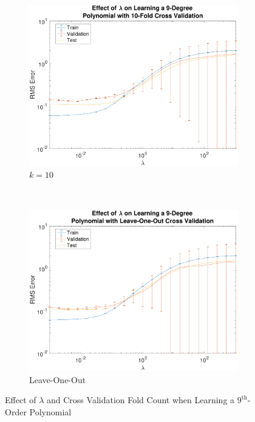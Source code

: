 \documentclass{report}
\begin{document}
  \begin{figure}
    \centering
    \begin{subfigure}[t]{0.45\textwidth}
      \centering
      \includegraphics[width=1.0\textwidth]{lambda_sweep_k=10_degree=9.pdf}
      \caption{$k=10$}\label{fig:tenFoldCv}
    \end{subfigure}%
    ~ 
    \begin{subfigure}[t]{0.45\textwidth}
      \centering
      \includegraphics[width=1.0\textwidth]{lambda_sweep_leave_one_out_degree=9.pdf}
      \caption{Leave-One-Out}\label{fig:leaveOneOutCv}
    \end{subfigure}
    \caption{Effect of $\lambda$ and Cross Validation Fold Count when Learning a $9^{\text{th}}$-Order Polynomial}\label{fig:effectLambda}
  \end{figure}
\end{document}

